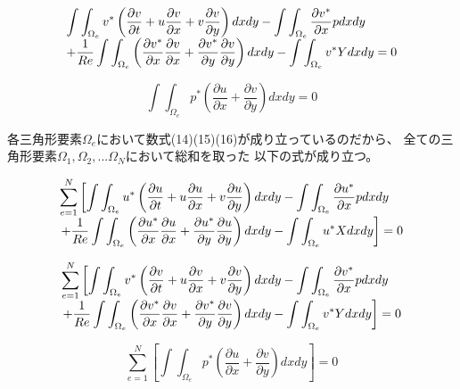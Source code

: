 \documentclass{jarticle}
\begin{document}
\begin{equation}
\begin{tabular}{l}
$\displaystyle
\int\int_{\Omega_e} v^*\left(\frac{\partial v}{\partial t}+u\frac{\partial v}{\partial x}+v\frac{\partial v}{\partial y}\right)dxdy - \int\int_{\Omega_e}\frac{\partial v^*}{\partial x}pdxdy
$
\\
$\displaystyle
+\frac{1}{Re}\int\int_{\Omega_e}\left(\frac{\partial v^*}{\partial x}\frac{\partial v}{\partial x}+\frac{\partial v^*}{\partial y}\frac{\partial v}{\partial y}\right)dxdy-\int\int_{\Omega_e} v^*Ydxdy=0
$
\end{tabular}
\end{equation}


\begin{equation}
\displaystyle
\int\int_{\Omega_e} p^*\left(\frac{\partial u}{\partial x}+\frac{\partial v}{\partial y}\right)dxdy = 0
\end{equation}


各三角形要素$\Omega_e$において数式(14)(15)(16)が成り立っているのだから、
全ての三角形要素$\Omega_1,\Omega_2,...\Omega_N$において総和を取った
以下の式が成り立つ。


\begin{equation}
\begin{tabular}{l}
$\displaystyle
\sum_{e=1}^N\left[\int\int_{\Omega_e} u^*\left(\frac{\partial u}{\partial t}+u\frac{\partial u}{\partial x}+v\frac{\partial u}{\partial y}\right)dxdy - \int\int_{\Omega_e}\frac{\partial u^*}{\partial x}pdxdy\right.
$
\\
$\displaystyle
\left.+\frac{1}{Re}\int\int_{\Omega_e}\left(\frac{\partial u^*}{\partial x}\frac{\partial u}{\partial x}+\frac{\partial u^*}{\partial y}\frac{\partial u}{\partial y}\right)dxdy-\int\int_{\Omega_e} u^*Xdxdy\right]=0
$
\end{tabular}
\end{equation}

\begin{equation}
\begin{tabular}{l}
$\displaystyle
\sum_{e=1}^N\left[\int\int_{\Omega_e} v^*\left(\frac{\partial v}{\partial t}+u\frac{\partial v}{\partial x}+v\frac{\partial v}{\partial y}\right)dxdy - \int\int_{\Omega_e}\frac{\partial v^*}{\partial x}pdxdy\right.
$
\\
$\displaystyle
\left.+\frac{1}{Re}\int\int_{\Omega_e}\left(\frac{\partial v^*}{\partial x}\frac{\partial v}{\partial x}+\frac{\partial v^*}{\partial y}\frac{\partial v}{\partial y}\right)dxdy-\int\int_{\Omega_e} v^*Ydxdy\right]=0
$
\end{tabular}
\end{equation}


\begin{equation}
\displaystyle
\sum_{e=1}^N\left[\int\int_{\Omega_e} p^*\left(\frac{\partial u}{\partial x}+\frac{\partial v}{\partial y}\right)dxdy\right] = 0
\end{equation}
\end{document}
